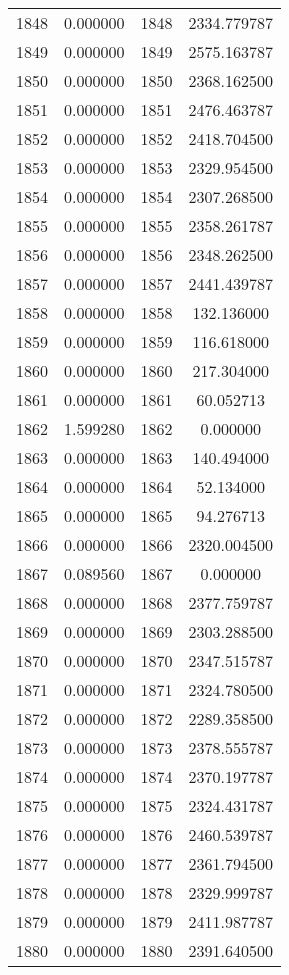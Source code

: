 \documentclass[12pt]{article}
\begin{document}
\begin{longtable}{@{}cccc@{}}
1848 & 0.000000 & 1848 & 2334.779787 \\
1849 & 0.000000 & 1849 & 2575.163787 \\
1850 & 0.000000 & 1850 & 2368.162500 \\
1851 & 0.000000 & 1851 & 2476.463787 \\
1852 & 0.000000 & 1852 & 2418.704500 \\
1853 & 0.000000 & 1853 & 2329.954500 \\
1854 & 0.000000 & 1854 & 2307.268500 \\
1855 & 0.000000 & 1855 & 2358.261787 \\
1856 & 0.000000 & 1856 & 2348.262500 \\
1857 & 0.000000 & 1857 & 2441.439787 \\
1858 & 0.000000 & 1858 & 132.136000 \\
1859 & 0.000000 & 1859 & 116.618000 \\
1860 & 0.000000 & 1860 & 217.304000 \\
1861 & 0.000000 & 1861 & 60.052713 \\
1862 & 1.599280 & 1862 & 0.000000 \\
1863 & 0.000000 & 1863 & 140.494000 \\
1864 & 0.000000 & 1864 & 52.134000 \\
1865 & 0.000000 & 1865 & 94.276713 \\
1866 & 0.000000 & 1866 & 2320.004500 \\
1867 & 0.089560 & 1867 & 0.000000 \\
1868 & 0.000000 & 1868 & 2377.759787 \\
1869 & 0.000000 & 1869 & 2303.288500 \\
1870 & 0.000000 & 1870 & 2347.515787 \\
1871 & 0.000000 & 1871 & 2324.780500 \\
1872 & 0.000000 & 1872 & 2289.358500 \\
1873 & 0.000000 & 1873 & 2378.555787 \\
1874 & 0.000000 & 1874 & 2370.197787 \\
1875 & 0.000000 & 1875 & 2324.431787 \\
1876 & 0.000000 & 1876 & 2460.539787 \\
1877 & 0.000000 & 1877 & 2361.794500 \\
1878 & 0.000000 & 1878 & 2329.999787 \\
1879 & 0.000000 & 1879 & 2411.987787 \\
1880 & 0.000000 & 1880 & 2391.640500 \\

\end{longtable}
\end{document}
